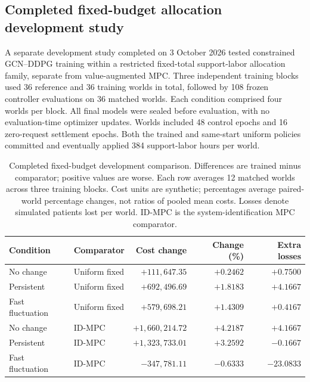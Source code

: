 \documentclass[preprint,review,12pt]{elsarticle}
\begin{document}
\subsection{Completed fixed-budget allocation development study}
\label{sec:fixed-budget-development}
A separate development study completed on 3 October 2026 tested constrained
GCN--DDPG training within a restricted fixed-total support-labor allocation
family, separate from value-augmented MPC. Three independent training blocks
used 36 reference and 36 training worlds in total, followed by 108 frozen
controller evaluations on 36 matched worlds. Each condition comprised four
worlds per block. All final models were sealed before evaluation, with no
evaluation-time optimizer updates. Worlds included 48 control epochs and
16 zero-request settlement epochs. Both the trained and same-start uniform
policies committed and eventually applied 384 support-labor hours per world.

\begin{table}[htbp]
\centering
\small
\caption{Completed fixed-budget development comparison. Differences are trained
minus comparator; positive values are worse. Each row averages 12 matched
worlds across three training blocks. Cost units are synthetic; percentages
average paired-world percentage changes, not ratios of pooled mean costs.
Losses denote simulated patients lost per world. ID-MPC is the
system-identification MPC comparator.}
\label{tab:fixed-budget-development}
\setlength{\tabcolsep}{4pt}
\begin{tabularx}{\textwidth}{@{}lXrrr@{}}
\toprule
Condition & Comparator & Cost change & Change (\%) & Extra losses \\
\midrule
No change & Uniform fixed & $+111{,}647.35$ & $+0.2462$ & $+0.7500$ \\
Persistent & Uniform fixed & $+692{,}496.69$ & $+1.8183$ & $+4.1667$ \\
Fast fluctuation & Uniform fixed & $+579{,}698.21$ & $+1.4309$ & $+0.4167$ \\
No change & ID-MPC & $+1{,}660{,}214.72$ & $+4.2187$ & $+4.1667$ \\
Persistent & ID-MPC & $+1{,}323{,}733.01$ & $+3.2592$ & $-0.1667$ \\
Fast fluctuation & ID-MPC & $-347{,}781.11$ & $-0.6333$ & $-23.0833$ \\
\bottomrule
\end{tabularx}
\end{table}
\end{document}
